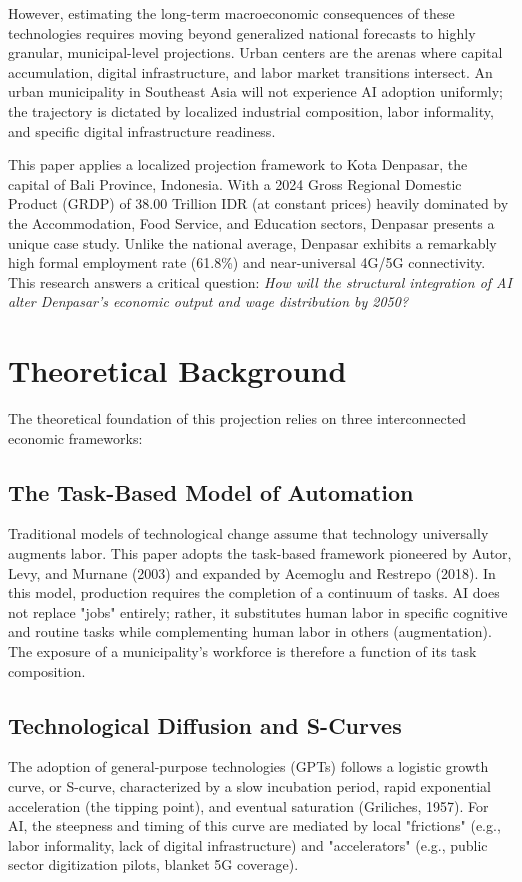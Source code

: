 \documentclass[11pt, a4paper]{article}
\begin{document}
However, estimating the long-term macroeconomic consequences of these technologies requires moving beyond generalized national forecasts to highly granular, municipal-level projections. Urban centers are the arenas where capital accumulation, digital infrastructure, and labor market transitions intersect. An urban municipality in Southeast Asia will not experience AI adoption uniformly; the trajectory is dictated by localized industrial composition, labor informality, and specific digital infrastructure readiness.

This paper applies a localized projection framework to Kota Denpasar, the capital of Bali Province, Indonesia. With a 2024 Gross Regional Domestic Product (GRDP) of 38.00 Trillion IDR (at constant prices) heavily dominated by the Accommodation, Food Service, and Education sectors, Denpasar presents a unique case study. Unlike the national average, Denpasar exhibits a remarkably high formal employment rate (61.8\%) and near-universal 4G/5G connectivity. This research answers a critical question: \textit{How will the structural integration of AI alter Denpasar's economic output and wage distribution by 2050?}

\section{Theoretical Background}
The theoretical foundation of this projection relies on three interconnected economic frameworks:

\subsection{The Task-Based Model of Automation}
Traditional models of technological change assume that technology universally augments labor. This paper adopts the task-based framework pioneered by Autor, Levy, and Murnane (2003) and expanded by Acemoglu and Restrepo (2018). In this model, production requires the completion of a continuum of tasks. AI does not replace "jobs" entirely; rather, it substitutes human labor in specific cognitive and routine tasks while complementing human labor in others (augmentation). The exposure of a municipality's workforce is therefore a function of its task composition.
  
  \subsection{Technological Diffusion and S-Curves}
  The adoption of general-purpose technologies (GPTs) follows a logistic growth curve, or S-curve, characterized by a slow incubation period, rapid exponential acceleration (the tipping point), and eventual saturation (Griliches, 1957). For AI, the steepness and timing of this curve are mediated by local "frictions" (e.g., labor informality, lack of digital infrastructure) and "accelerators" (e.g., public sector digitization pilots, blanket 5G coverage).
  
\end{document}
